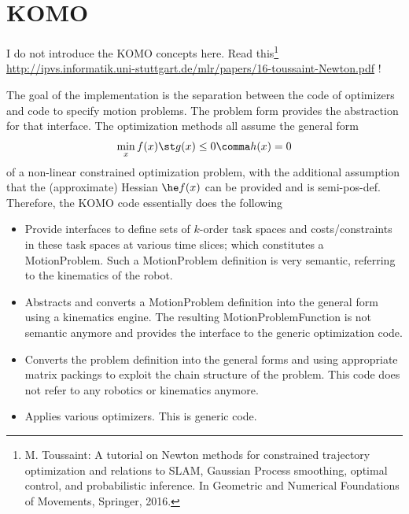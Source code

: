 \documentclass[10pt,fleqn,twoside]{article}
\begin{document}
{{%


\section{KOMO}

I do not introduce the KOMO concepts here. Read this\footnote{
M. Toussaint: A tutorial on Newton methods for constrained trajectory
optimization and relations to SLAM, Gaussian Process smoothing,
optimal control, and probabilistic inference. In Geometric and
Numerical Foundations of Movements, Springer, 2016.}
\url{http://ipvs.informatik.uni-stuttgart.de/mlr/papers/16-toussaint-Newton.pdf} !

The goal of the implementation is the separation between the code of
optimizers and code to specify motion problems. The problem
form  provides the abstraction for that interface. The
optimization methods all assume the general form
\begin{align}\label{eqOpt}
\min_x f(x) \st g(x)\le 0 \comma h(x) = 0
\end{align}
of a non-linear constrained optimization problem, with the additional
assumption that the (approximate) Hessian $\he f(x)$ can be provided
and is semi-pos-def. Therefore, the KOMO code essentially does the
following
\begin{itemize}
\item Provide interfaces to define sets of $k$-order task spaces and
costs/constraints in these task spaces at various time slices; which
constitutes a MotionProblem. Such a MotionProblem definition is very
semantic, referring to the kinematics of the robot.
\item Abstracts and converts a MotionProblem definition into the general
form  using a kinematics engine. The resulting
MotionProblemFunction is not semantic anymore and provides the
interface to the generic optimization code.
\item Converts the problem definition  into the general
forms  and  using appropriate matrix packings
to exploit the chain structure of the problem. This code does not
refer to any robotics or kinematics anymore.
\item Applies various optimizers. This is generic code.
\end{itemize}

}}
\end{document}

